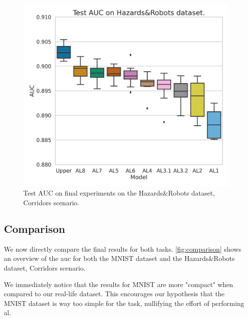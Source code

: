             \begin{figure}[H]
                \centering
                \centerline{\includegraphics[width=\textwidth]{img/results/final_Hazards&Robots.png}}
                \caption{Test AUC on final experiments on the Hazards\&Robots dataset, Corridors scenario.}
                \label{fig:comparison-RM}
            \end{figure}
            
        \subsection{Comparison}
            We now directly compare the final results for both tasks. \autoref{fig:comparison} shows an overview of the \acrshort{auc} for both the MNIST dataset and the Hazards\&Robots dataset, Corridors scenario.
            
            We immediately notice that the results for MNIST are more "compact" when compared to our real-life dataset. This encourages our hypothesis that the MNIST dataset is way too simple for the task, nullifying the effort of performing \acrshort{al}.
            
